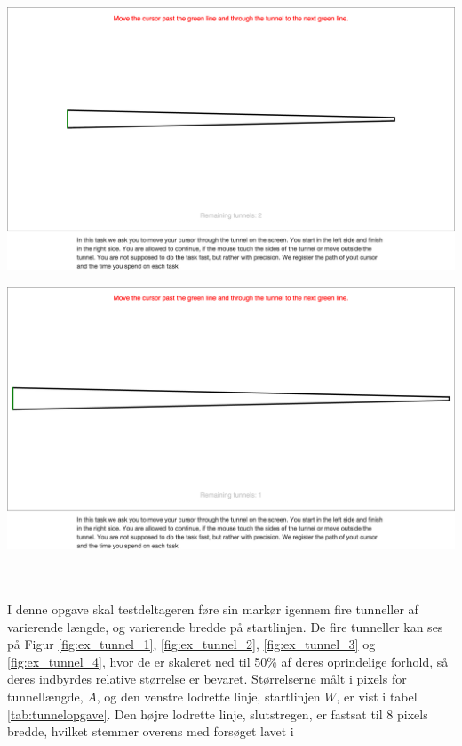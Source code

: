 \begin{minipage}{\linewidth}
\begin{minipage}{\textwidth}
		\label{fig:ex_tunnel_2}
	\end{minipage}
	\begin{minipage}{\textwidth}
		\centering
		\includegraphics[width=\textwidth, trim = .5cm 21cm .5cm 15cm, clip]{images/screenshots/ex_step_4_tunnel_3}
		\label{fig:ex_tunnel_3}
	\end{minipage}
	\begin{minipage}{\textwidth}
		\centering
		\includegraphics[width=\textwidth, trim = .5cm 20cm .5cm 15cm, clip]{images/screenshots/ex_step_4_tunnel_4}
		\label{fig:ex_tunnel_4}
	\end{minipage}
\end{minipage}\\\\
I denne opgave skal testdeltageren føre sin markør igennem fire tunneller af varierende længde, og varierende bredde på startlinjen. De fire tunneller kan ses på Figur \ref{fig:ex_tunnel_1}, \ref{fig:ex_tunnel_2}, \ref{fig:ex_tunnel_3} og \ref{fig:ex_tunnel_4}, hvor de er skaleret ned til 50\% af deres oprindelige forhold, så deres indbyrdes relative størrelse er bevaret.  Størrelserne målt i pixels for tunnellængde, $A$, og den venstre lodrette linje, startlinjen $W$, er vist i tabel \ref{tab:tunnelopgave}. Den højre lodrette linje, slutstregen, er fastsat til 8 pixels bredde, hvilket stemmer overens med forsøget lavet i \cite{accot1997}

